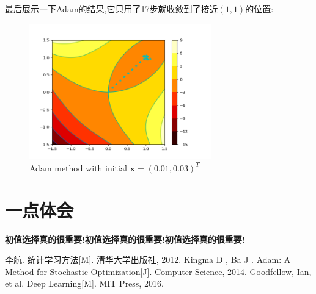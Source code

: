 \documentclass[UTF8,a4paper,11pt]{ctexart}
\begin{document}
\par 最后展示一下Adam的结果,它只用了17步就收敛到了接近$(1,1)$的位置:
\begin{figure}[H]
	\centering
	\includegraphics[width=0.7\textwidth,height=0.5\textwidth]{adam1.png}
	\caption{Adam method with initial $\mathbf{x}=(0.01,0.03)^{T}$}
\end{figure} 

\section{一点体会}
\par \textbf{初值选择真的很重要!初值选择真的很重要!初值选择真的很重要!}
\begin{thebibliography}{3}  
	 李航. 统计学习方法[M]. 清华大学出版社, 2012.
	 Kingma D , Ba J . Adam: A Method for Stochastic Optimization[J]. Computer Science, 2014.
	 Goodfellow, Ian, et al. Deep Learning[M]. MIT Press, 2016. 	
\end{thebibliography}
\end{document}
